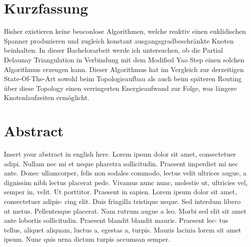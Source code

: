 \section*{Kurzfassung}
Bisher existieren keine beaconlose Algorithmen, welche reaktiv einen euklidischen Spanner produzieren und zugleich konstant ausgangsgradbeschränkte Knoten beinhalten.
In dieser Bachelorarbeit werde ich untersuchen, ob die Partial Delaunay Triangulation in Verbindung mit dem Modified Yao Step einen solchen Algorithmus erzeugen kann.
Dieser Algorithmus hat im Vergleich zur derzeitigen State-Of-The-Art sowohl beim Topologieaufbau als auch beim späteren Routing über diese Topology einen verringerten Energieaufwand zur Folge, was längere Knotenlaufzeiten ermöglicht.


\section*{Abstract}
Insert your abstract in english here. Lorem ipsum dolor sit amet, consectetuer adipi.
Nullam nec mi et neque pharetra sollicitudin. Praesent imperdiet mi nec ante. Donec 
ullamcorper, felis non sodales commodo, lectus velit ultrices augue, a dignissim nibh 
lectus placerat pede. Vivamus nunc nunc, molestie ut, ultricies vel, semper in, velit. 
Ut porttitor. Praesent in sapien. Lorem ipsum dolor sit amet, consectetuer adipis- 
cing elit. Duis fringilla tristique neque. Sed interdum libero ut metus. Pellentesque 
placerat. Nam rutrum augue a leo. Morbi sed elit sit amet ante lobortis sollicitudin. 
Praesent blandit blandit mauris. Praesent lec- tus tellus, aliquet aliquam, luctus a, 
egestas a, turpis. Mauris lacinia lorem sit amet ipsum. Nunc quis urna dictum turpis 
accumsan semper.